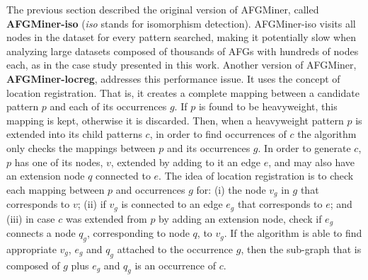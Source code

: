 The previous section described the original version of AFGMiner, called {\bf AFGMiner-iso} (\emph{iso} stands for isomorphism detection). AFGMiner-iso visits all nodes in the dataset for every pattern searched, making it potentially slow when analyzing large datasets composed of thousands of AFGs with hundreds of nodes each, as in the case study presented in this work. Another version of AFGMiner, {\bf AFGMiner-locreg}, addresses this performance issue. It uses the concept of location registration. That is, it creates a complete mapping between a candidate pattern $p$ and each of its occurrences $g$. If $p$ is found to be heavyweight, this mapping is kept, otherwise it is discarded. Then, when a heavyweight pattern $p$ is extended into its child patterns $c$, in order to find occurrences of $c$ the algorithm only checks the mappings between $p$ and its occurrences $g$. In order to generate $c$, $p$ has one of its nodes, $v$, extended by adding to it an edge $e$, and may also have an extension node $q$ connected to $e$. The idea of location registration is to check each mapping between $p$ and occurrences $g$ for: (i) the node $v_g$ in $g$ that corresponds to $v$; (ii) if $v_g$ is connected to an edge $e_g$ that corresponds to $e$; and (iii) in case $c$ was extended from $p$ by adding an extension node, check if $e_g$ connects a node $q_g$, corresponding to node $q$, to $v_g$. If the algorithm is able to find appropriate $v_g$, $e_g$ and $q_g$ attached to the occurrence $g$, then the sub-graph that is composed of $g$ plus $e_g$ and $q_g$ is an occurrence of $c$.






